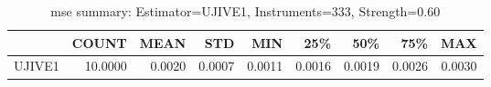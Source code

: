 \begin{table}[ht]
\centering
\caption{mse summary: Estimator=UJIVE1, Instruments=333, Strength=0.60}
\begin{tabular}{lrrrrrrrr}
\toprule
 & COUNT & MEAN & STD & MIN & 25\% & 50\% & 75\% & MAX \\
\midrule
UJIVE1 & 10.0000 & 0.0020 & 0.0007 & 0.0011 & 0.0016 & 0.0019 & 0.0026 & 0.0030 \\
\bottomrule
\end{tabular}
\end{table}
